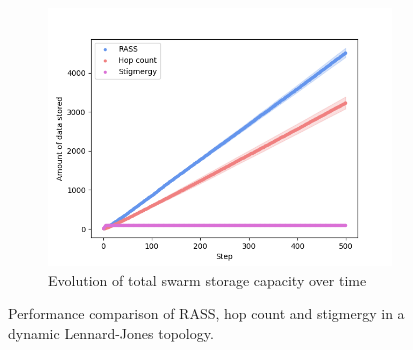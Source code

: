 \documentclass[sigconf]{aamas}
\begin{document}
\begin{figure}
\begin{subfigure}{0.30\textwidth}
        \includegraphics[width=\textwidth]{figures/lennard_storage.png}
        \caption{Evolution of total swarm storage capacity over time}
        \label{results:lennard_100_storage}
    \end{subfigure}
    \caption{Performance comparison of RASS, hop count and stigmergy in a dynamic Lennard-Jones topology.}
    \label{results:dynamicTopologyLennard}
    \vspace{-2mm}
\end{figure}
\end{document}
